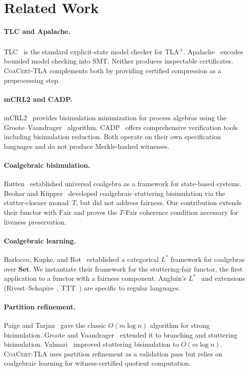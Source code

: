 \documentclass[11pt]{article}
\newcommand{\Set}{\mathbf{Set}}
\newcommand{\Fair}{\ensuremath{\mathrm{Fair}}}
\newcommand{\TFair}{$T$-Fair}
\newcommand{\CoaCert}{\textsc{CoaCert-TLA}}
\newcommand{\TLAplus}{TLA\textsuperscript{+}}
\begin{document}
\section{Related Work}
\label{sec:related}

\paragraph{TLC and Apalache.}
TLC~\cite{TLC} is the standard explicit-state model checker for
\TLAplus{}.
Apalache~\cite{Apalache} encodes bounded model checking into SMT.
Neither produces inspectable certificates.
\CoaCert{} complements both by providing certified compression as a
preprocessing step.

\paragraph{mCRL2 and CADP.}
mCRL2~\cite{mCRL2} provides bisimulation minimization for process
algebras using the Groote--Vaandrager~\cite{GrooteV90} algorithm.
CADP~\cite{CADP} offers comprehensive verification tools including
bisimulation reduction.
Both operate on their own specification languages and do not produce
Merkle-hashed witnesses.

\paragraph{Coalgebraic bisimulation.}
Rutten~\cite{Rutten00} established universal coalgebra as a framework
for state-based systems.
Beohar and K\"upper~\cite{BeoharK17} developed coalgebraic stuttering
bisimulation via the stutter-closure monad~$T$, but did not address
fairness.
Our contribution extends their functor with $\Fair$ and proves the
\TFair{} coherence condition necessary for liveness preservation.

\paragraph{Coalgebraic learning.}
Barlocco, Kupke, and Rot~\cite{BarloccoKR19} established a categorical
$L^*$ framework for coalgebras over $\Set$.
We instantiate their framework for the stuttering-fair functor, the
first application to a functor with a fairness component.
Angluin's $L^*$~\cite{Angluin87} and extensions
(Rivest--Schapire~\cite{RivestS93}, TTT~\cite{IsbernMP14}) are specific
to regular languages.

\paragraph{Partition refinement.}
Paige and Tarjan~\cite{PaigeTarjan87} gave the classic $O(m \log n)$
algorithm for strong bisimulation.
Groote and Vaandrager~\cite{GrooteV90} extended it to branching and
stuttering bisimulation.
Valmari~\cite{Valmari09} improved stuttering bisimulation to
$O(m \log n)$.
\CoaCert{} uses partition refinement as a validation pass but relies on
coalgebraic learning for witness-certified quotient computation.
\end{document}
